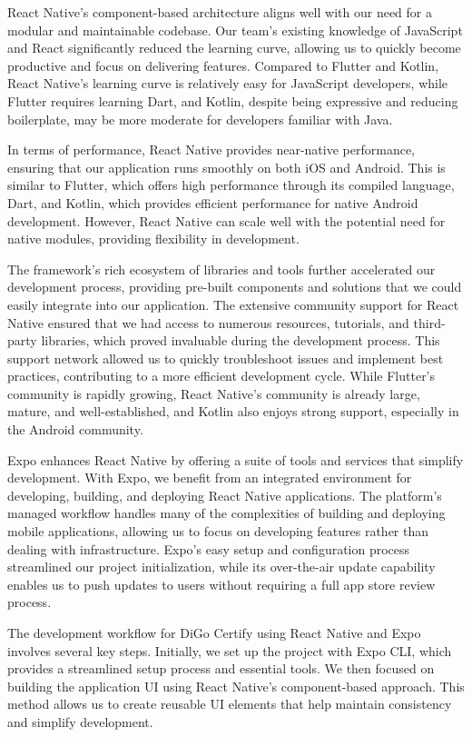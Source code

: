 React Native’s component-based architecture aligns well with our need for a modular and maintainable codebase. Our team’s existing knowledge of JavaScript and React significantly reduced the learning curve, allowing us to quickly become productive and focus on delivering features. Compared to Flutter and Kotlin, React Native's learning curve is relatively easy for JavaScript developers, while Flutter requires learning Dart, and Kotlin, despite being expressive and reducing boilerplate, may be more moderate for developers familiar with Java.

In terms of performance, React Native provides near-native performance, ensuring that our application runs smoothly on both iOS and Android. This is similar to Flutter, which offers high performance through its compiled language, Dart, and Kotlin, which provides efficient performance for native Android development. However, React Native can scale well with the potential need for native modules, providing flexibility in development.

The framework’s rich ecosystem of libraries and tools further accelerated our development process, providing pre-built components and solutions that we could easily integrate into our application. The extensive community support for React Native ensured that we had access to numerous resources, tutorials, and third-party libraries, which proved invaluable during the development process. This support network allowed us to quickly troubleshoot issues and implement best practices, contributing to a more efficient development cycle. While Flutter's community is rapidly growing, React Native's community is already large, mature, and well-established, and Kotlin also enjoys strong support, especially in the Android community.

Expo enhances React Native by offering a suite of tools and services that simplify development. With Expo, we benefit from an integrated environment for developing, building, and deploying React Native applications. The platform’s managed workflow handles many of the complexities of building and deploying mobile applications, allowing us to focus on developing features rather than dealing with infrastructure. Expo’s easy setup and configuration process streamlined our project initialization, while its over-the-air update capability enables us to push updates to users without requiring a full app store review process.

The development workflow for DiGo Certify using React Native and Expo involves several key steps. Initially, we set up the project with Expo CLI, which provides a streamlined setup process and essential tools. We then focused on building the application UI using React Native’s component-based approach. This method allows us to create reusable UI elements that help maintain consistency and simplify development.

